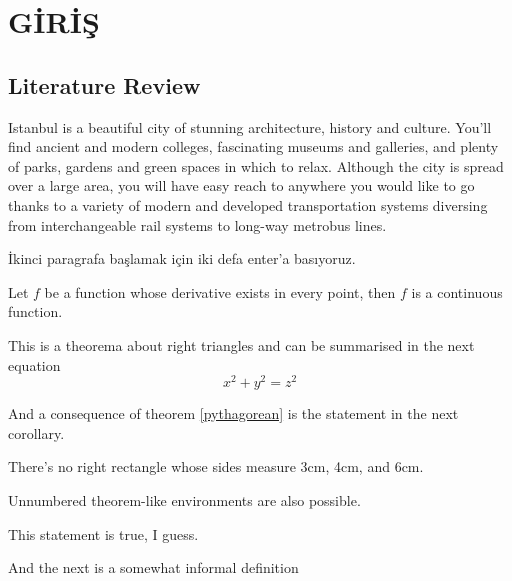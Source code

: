 \chapter{GİRİŞ}


\section{Literature Review}
Istanbul is a beautiful city of stunning architecture, history and culture. You'll find ancient and modern colleges, fascinating museums and galleries, and plenty of parks, gardens and green spaces in which to relax. Although the city is spread over a large area, you will have easy reach to anywhere you would like to go thanks to a variety of modern and developed transportation systems diversing from interchangeable rail systems to long-way metrobus lines.

İkinci paragrafa başlamak için iki defa enter'a basıyoruz.

\begin{theorem}
Let $f$ be a function whose derivative exists in every point, then $f$ is 
a continuous function.
\end{theorem}
 
\begin{theorem}
\label{pythagorean}
This is a theorema about right triangles and can be summarised in the next 
equation 
\begin{equation}
x^2 + y^2 = z^2
\end{equation}
\end{theorem}

And a consequence of theorem \ref{pythagorean} is the statement in the next 
corollary.
 
\begin{corollary}
There's no right rectangle whose sides measure 3cm, 4cm, and 6cm.
\end{corollary}
 

Unnumbered theorem-like environments are also possible.
 
\begin{remark}
This statement is true, I guess.
\end{remark}
 
And the next is a somewhat informal definition
 
